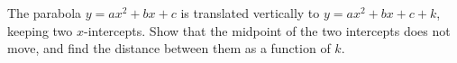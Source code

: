 The parabola $y=ax^2+bx+c$ is translated vertically to $y=ax^2+bx+c+k$, keeping two $x$-intercepts. Show that the midpoint of the two intercepts does not move, and find the distance between them as a function of $k$.
